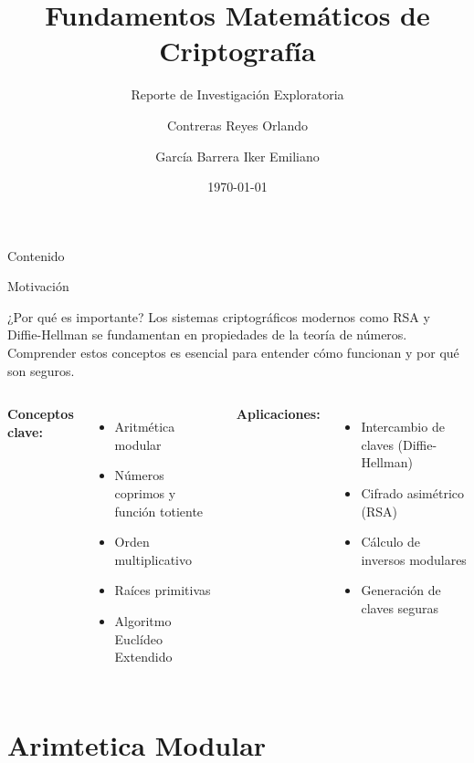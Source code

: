 \documentclass[aspectratio=169]{beamer}
\title{Fundamentos Matemáticos de Criptografía}
\subtitle{Reporte de Investigación Exploratoria}
\author{Contreras Reyes Orlando \and García Barrera Iker Emiliano}
\institute{Universidad Autónoma de Aguascalientes \\ Ingeniería Electrónica}
\date{\today}
\begin{document}
\begin{frame}
\titlepage
\end{frame}

\begin{frame}{Contenido}
\tableofcontents
\end{frame}



\begin{frame}{Motivación}
\begin{block}{¿Por qué es importante?}
Los sistemas criptográficos modernos como RSA y Diffie-Hellman se fundamentan en propiedades de la teoría de números. Comprender estos conceptos es esencial para entender cómo funcionan y por qué son seguros.
\end{block}

\vspace{0.5cm}

\begin{columns}[T]
\textbf{Conceptos clave:}
\begin{itemize}
\item Aritmética modular
\item Números coprimos y función totiente
\item Orden multiplicativo
\item Raíces primitivas
\item Algoritmo Euclídeo Extendido
\end{itemize}

\textbf{Aplicaciones:}
\begin{itemize}
\item Intercambio de claves (Diffie-Hellman)
\item Cifrado asimétrico (RSA)
\item Cálculo de inversos modulares
\item Generación de claves seguras
\end{itemize}
\end{columns}
\end{frame}

\section{Arimtetica Modular}
\end{document}
